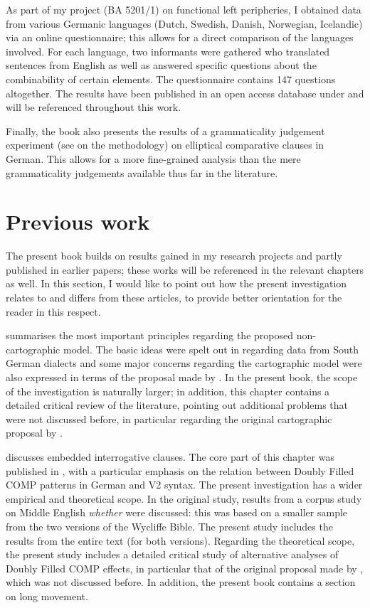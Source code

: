 As part of my project (BA 5201/1) on functional left peripheries, I obtained data from various Germanic languages (Dutch, Swedish, Danish, Norwegian, Icelandic) via an online questionnaire; this allows for a direct comparison of the languages involved. For each language, two informants were gathered who translated sentences from English as well as answered specific questions about the combinability of certain elements. The questionnaire contains 147 questions altogether. The results have been published in an open access database under \citet{bacskaiatkaribaudisch2018} and will be referenced throughout this work.

Finally, the book also presents the results of a grammaticality judgement experiment (see \citealt{schuetze2016} on the methodology) on elliptical comparative clauses in German. This allows for a more fine-grained analysis than the mere grammaticality judgements available thus far in the literature.

\section{Previous work}
The present book builds on results gained in my research projects and partly published in earlier papers; these works will be referenced in the relevant chapters as well. In this section, I would like to point out how the present investigation relates to and differs from these articles, to provide better orientation for the reader in this respect.

 summarises the most important principles regarding the proposed non-cartographic model. The basic ideas were spelt out in \citet{bacskaiatkari2018sardis} regarding data from South German dialects and some major concerns regarding the cartographic model were also expressed in terms of the proposal made by \citet{baltin2010}. In the present book, the scope of the investigation is naturally larger; in addition, this chapter contains a detailed critical review of the literature, pointing out additional problems that were not discussed before, in particular regarding the original cartographic proposal by \citet{rizzi1997, rizzi2004}.

 discusses embedded interrogative clauses. The core part of this chapter was published in \citet{bacskaiatkari2020jcgl}, with a particular emphasis on the relation between Doubly Filled COMP patterns in German and V2 syntax. The present investigation has a wider empirical and theoretical scope. In the original study, results from a corpus study on Middle English \textit{whether} were discussed: this was based on a smaller sample from the two versions of the Wycliffe Bible. The present study includes the results from the entire text (for both versions). Regarding the theoretical scope, the present study includes a detailed critical study of alternative analyses of Doubly Filled COMP effects, in particular that of the original proposal made by \citet{chomskylasnik1977}, which was not discussed before. In addition, the present book contains a section on long movement.

